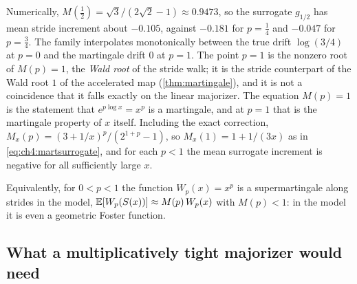 Numerically, $M(\tfrac12)=\sqrt3/(2\sqrt2-1)\approx0.9473$, so the surrogate
$g_{1/2}$ has mean stride increment about $-0.105$, against $-0.181$ for
$p=\tfrac14$ and $-0.047$ for $p=\tfrac34$.  The family interpolates
monotonically between the true drift $\log(3/4)$ at $p=0$ and the martingale
drift $0$ at $p=1$.  The point $p=1$ is the nonzero root of $M(p)=1$, the
\emph{Wald root} of the stride walk; it is the stride counterpart of the Wald
root $1$ of the accelerated map (\cref{thm:martingale}), and it is not a coincidence that
it falls exactly on the linear majorizer.  The equation $M(p)=1$ is the
statement that $e^{p\log x}=x^{p}$ is a martingale, and at
$p=1$ that is the martingale property of $x$ itself.  Including the exact
correction, $M_x(p)=(3+1/x)^{p}/(2^{1+p}-1)$, so $M_x(1)=1+1/(3x)$ as in
\eqref{eq:ch4:martsurrogate}, and for each $p<1$ the mean surrogate increment
is negative for all sufficiently large $x$.

Equivalently, for $0<p<1$ the function $W_p(x)=x^{p}$ is a supermartingale
along strides in the model, $\mathbb{E}[W_p(S(x))]\approx M(p)\,W_p(x)$ with
$M(p)<1$: in the model it is even a geometric Foster function.

\subsection{What a multiplicatively tight majorizer would need}


